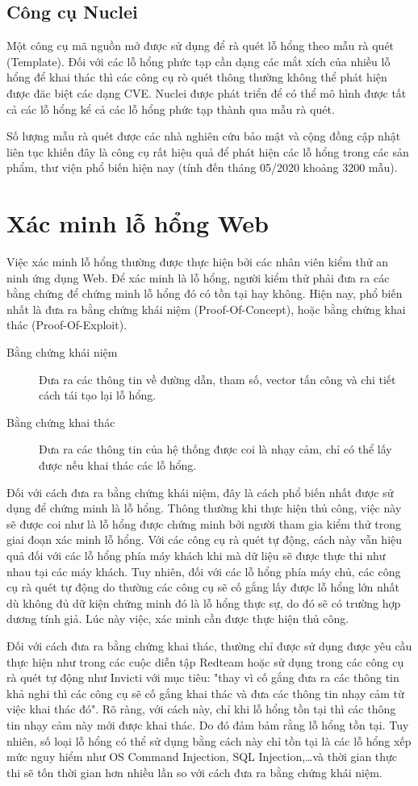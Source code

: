 \documentclass[./../main.tex]{subfiles}
\begin{document}
\subsection{Công cụ Nuclei}
Một công cụ mã nguồn mở được sử dụng để rà quét lỗ hổng theo mẫu rà quét (Template).
Đối với các lỗ hổng phức tạp cần dạng các mắt xích của nhiều lỗ hổng để
khai thác thì các công cụ rò quét thông thường không thể phát hiện được đăc biệt
các dạng CVE. Nuclei được phát triển để có thể mô hình được tất cả các lỗ
hổng kể cả các lỗ hổng phức tạp thành qua mẫu rà quét.

Số lượng mẫu rà quét được các nhà nghiên cứu bảo mật và cộng đồng cập nhật liên tục
khiến đây là công cụ rất hiệu quả để phát hiện các lỗ hổng trong các sản phẩm,
thư viện phổ biến hiện nay (tính đến tháng 05/2020 khoảng 3200 mẫu).


\section{Xác minh lỗ hổng Web}

Việc xác minh lỗ hổng thường được thực hiện bởi các nhân viên kiểm thử an ninh ứng dụng Web. Để xác minh là lỗ hổng, người kiểm thử phải đưa ra các bằng chứng để chứng minh lỗ hổng đó có tồn tại hay không. Hiện nay, phổ biến nhất là đưa ra bằng chứng khái niệm (Proof-Of-Concept), hoặc bằng chứng khai thác (Proof-Of-Exploit).
\begin{description}
	\item[Bằng chứng khái niệm] Đưa ra các thông tin về đường dẫn, tham số, vector tấn công và chi tiết cách tái tạo lại lỗ hổng.
	\item[Bằng chứng khai thác] Đưa ra các thông tin của hệ thống được coi là nhạy cảm, chỉ có thể lấy được nếu khai thác các lỗ hổng.
\end{description}

Đối với cách đưa ra bằng chứng khái niệm, đây là cách phổ biến nhất được sử dụng để chứng minh là lỗ hổng. Thông thường khi thực hiện thủ công, việc này sẽ được coi như là lỗ hổng được chứng minh bởi người tham gia kiểm thử trong giai đoạn xác minh lỗ hổng. Với các công cụ rà quét tự động, cách này vẫn hiệu quả đối với các lỗ hổng phía máy khách khi mà dữ liệu sẽ được thực thi như nhau tại các máy khách. Tuy nhiên, đối với các lỗ hổng phía máy chủ, các công cụ rà quét tự động do thường các công cụ sẽ cố gắng lấy được lỗ hổng lớn nhất dù không đủ dữ kiện chứng minh đó là lỗ hổng thực sự, do đó sẽ có trường hợp dương tính giả. Lúc này việc, xác minh cần được thực hiện thủ công.

Đối với cách đưa ra bằng chứng khai thác, thường chỉ được sử dụng được yêu cầu thực hiện như trong các cuộc diễn tập Redteam hoặc sử dụng trong các công cụ rà quét tự động như Invicti với mục tiêu: "thay vì cố gắng đưa ra các thông tin khả nghi thì các công cụ sẽ cố gắng khai thác và đưa các thông tin nhạy cảm từ việc khai thác đó". Rõ ràng, với cách này, chỉ khi lỗ hổng tồn tại thì các thông tin nhạy cảm này mới được khai thác. Do đó đảm bảm rằng lỗ hổng tồn tại. Tuy nhiên, số loại lỗ hổng có thể sử dụng bằng cách này chỉ tồn tại là các lỗ hổng xếp mức nguy hiểm như OS Command Injection, SQL Injection,\ldots và thời gian thực thi sẽ tốn thời gian hơn nhiều lần so với cách đưa ra bằng chứng khái niệm.
\end{document}
